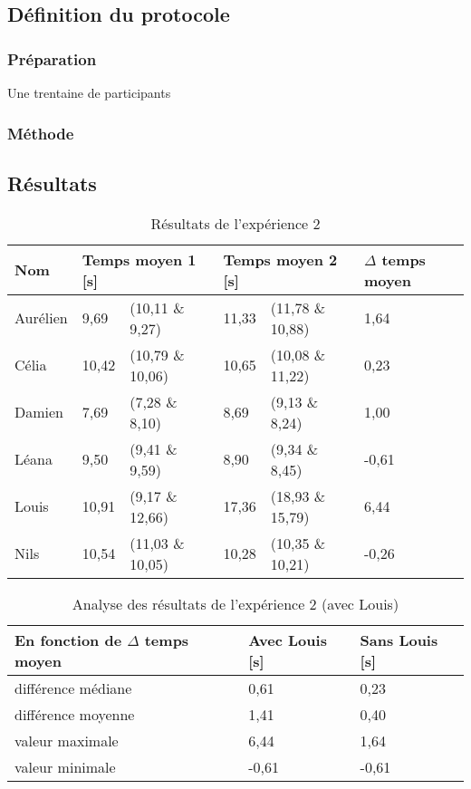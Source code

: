 \documentclass[12pt,fleqn,oneside,openany]{book} %
\begin{document}
\subsection{Définition du protocole} \label{ssec:defProto2.1}

\subsubsection{Préparation} \label{sssec:preparation2.2}
\begin{description}
	\item[Une trentaine de participants]
\end{description}

\subsubsection{Méthode} \label{sssec:methode2.2}

\subsection{Résultats} \label{ssec:resultats2.2}

\begin{table}[h]
	\centering
	\caption{Résultats de l'expérience 2} \label{tbl:exp2.1}
	\begin{tabular}{llllll}
		\toprule
		\textbf{Nom} &  \multicolumn{2}{l}{\textbf{Temps moyen 1 [s]}}  & \multicolumn{2}{l}{\textbf{Temps moyen 2 [s]}} & \textbf{$\Delta$ temps moyen} \\ \midrule
		Aurélien & 9,69 & (10,11 \& 9,27) & 11,33 & (11,78 \& 10,88) & 1,64 \\
		Célia & 10,42 & (10,79 \& 10,06) & 10,65 & (10,08 \& 11,22) & 0,23 \\
		Damien & 7,69 & (7,28 \& 8,10) & 8,69 & (9,13 \& 8,24) & 1,00 \\
		Léana & 9,50 & (9,41 \& 9,59) & 8,90 & (9,34 \& 8,45) & -0,61 \\
		Louis & 10,91 & (9,17 \& 12,66) & 17,36 & (18,93 \& 15,79) & 6,44 \\
		Nils & 10,54 & (11,03 \& 10,05) & 10,28 & (10,35 \& 10,21) & -0,26 \\ \bottomrule
	\end{tabular}
\end{table}

\begin{table}[h]
	\centering
	\caption{Analyse des résultats de l'expérience 2 (avec Louis)} \label{tbl:exp2.1}
	\begin{tabular}{lll}
		\toprule 
		\textbf{En fonction de $\Delta$ temps moyen} & \textbf{Avec Louis [s]} & \textbf{Sans Louis [s]} \\ \midrule
		différence médiane & 0,61 & 0,23 \\
		différence moyenne & 1,41 & 0,40 \\
		valeur maximale & 6,44 & 1,64 \\
		valeur minimale & -0,61 & -0,61 \\ \bottomrule
	\end{tabular}
\end{table}
\end{document}
